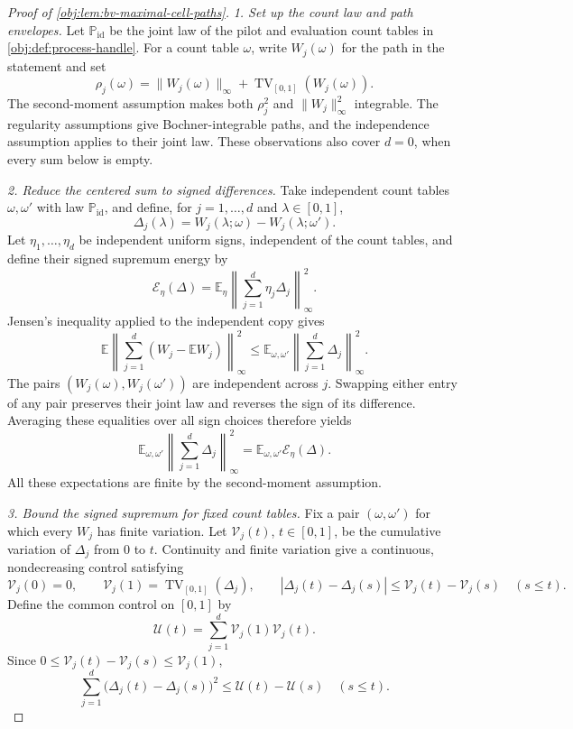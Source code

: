 \documentclass[11pt]{article}
\begin{document}
\begin{proof}[Proof of \cref{obj:lem:bv-maximal-cell-paths}]
\noindent\textit{1. Set up the count law and path envelopes.}
Let \(\mathbb P_{\mathrm{id}}\) be the joint law of the pilot and evaluation count tables in \cref{obj:def:process-handle}. For a count table \(\omega\), write \(W_j(\omega)\) for the path in the statement and set
\[
\rho_j(\omega)
=\|W_j(\omega)\|_\infty+
  \operatorname{TV}_{[0,1]}(W_j(\omega)).
\]
The second-moment assumption makes both \(\rho_j^2\) and
\(\|W_j\|_\infty^2\) integrable. The regularity assumptions give
Bochner-integrable paths, and the independence assumption applies to their
joint law. These observations also cover \(d=0\), when every sum below is
empty. %

\noindent\textit{2. Reduce the centered sum to signed differences.}
Take independent count tables \(\omega,\omega'\) with law
\(\mathbb P_{\mathrm{id}}\), and define, for \(j=1,\ldots,d\) and
\(\lambda\in[0,1]\),
\[
\Delta_j(\lambda)
=W_j(\lambda;\omega)-W_j(\lambda;\omega').
\]
Let \(\eta_1,\ldots,\eta_d\) be independent uniform signs, independent of
the count tables, and define their signed supremum energy by
\[
\mathcal E_\eta(\Delta)
=\mathbb E_\eta\left\|
  \sum_{j=1}^d\eta_j\Delta_j
 \right\|_\infty^2.
\]
Jensen's inequality applied to the independent copy gives
\[
\mathbb E\left\|
 \sum_{j=1}^d(W_j-\mathbb EW_j)
 \right\|_\infty^2
\le
\mathbb E_{\omega,\omega'}\left\|
 \sum_{j=1}^d\Delta_j
 \right\|_\infty^2.
\]
The pairs \((W_j(\omega),W_j(\omega'))\) are independent across \(j\).
Swapping either entry of any pair preserves their joint law and reverses
the sign of its difference. Averaging these equalities over all sign
choices therefore yields
\[
\mathbb E_{\omega,\omega'}\left\|
 \sum_{j=1}^d\Delta_j
 \right\|_\infty^2
=
\mathbb E_{\omega,\omega'}\mathcal E_\eta(\Delta).
\]
All these expectations are finite by the second-moment assumption.

\noindent\textit{3. Bound the signed supremum for fixed count tables.}
Fix a pair \((\omega,\omega')\) for which every \(W_j\) has finite
variation. Let \(\mathcal V_j(t)\), \(t\in[0,1]\), be the cumulative
variation of \(\Delta_j\) from \(0\) to \(t\). Continuity and finite
variation give a continuous, nondecreasing control satisfying
\[
\mathcal V_j(0)=0,\qquad
\mathcal V_j(1)=\operatorname{TV}_{[0,1]}(\Delta_j),\qquad
|\Delta_j(t)-\Delta_j(s)|
 \le \mathcal V_j(t)-\mathcal V_j(s)\quad(s\le t).
\]
Define the common control on \([0,1]\) by
\[
\mathcal U(t)=\sum_{j=1}^d
  \mathcal V_j(1)\mathcal V_j(t).
\]
Since \(0\le\mathcal V_j(t)-\mathcal V_j(s)\le\mathcal V_j(1)\),
\begin{equation}
\sum_{j=1}^d\bigl(\Delta_j(t)-\Delta_j(s)\bigr)^2
 \le \mathcal U(t)-\mathcal U(s)
 \quad(s\le t).
\label{eq:obj:bv-maximal-cell-paths-control}
\end{equation}


\end{proof}
\end{document}
